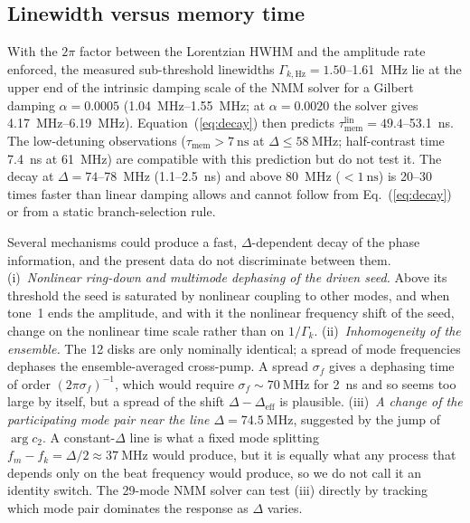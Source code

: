 \documentclass[aps,prb,reprint,superscriptaddress,floatfix]{revtex4-2}
\newcommand{\Deff}{\Delta_{\mathrm{eff}}}
\begin{document}
\subsection{Linewidth versus memory time}\label{sec:disc-tension}

With the $2\pi$ factor between the Lorentzian HWHM and the amplitude rate enforced, the measured sub-threshold linewidths $\Gamma_{k,\mathrm{Hz}}=1.50$--\SI{1.61}{\mega\hertz} lie at the upper end of the intrinsic damping scale of the NMM solver for a Gilbert damping $\alpha=0.0005$ (\SIrange{1.04}{1.55}{\mega\hertz}; at $\alpha=0.0020$ the solver gives \SIrange{4.17}{6.19}{\mega\hertz}). Equation~(\ref{eq:decay}) then predicts $\tau_{\mathrm{mem}}^{\mathrm{lin}}=49.4$--\SI{53.1}{\nano\second}. The low-detuning observations ($\tau_{\mathrm{mem}}>\SI{7}{\nano\second}$ at $\Delta\le\SI{58}{\mega\hertz}$; half-contrast time \SI{7.4}{\nano\second} at \SI{61}{\mega\hertz}) are compatible with this prediction but do not test it. The decay at $\Delta=74$--\SI{78}{\mega\hertz} (1.1--\SI{2.5}{\nano\second}) and above \SI{80}{\mega\hertz} ($<\SI{1}{\nano\second}$) is 20--30 times faster than linear damping allows and cannot follow from Eq.~(\ref{eq:decay}) or from a static branch-selection rule.

Several mechanisms could produce a fast, $\Delta$-dependent decay of the phase information, and the present data do not discriminate between them. (i)~\emph{Nonlinear ring-down and multimode dephasing of the driven seed.} Above its threshold the seed is saturated by nonlinear coupling to other modes, and when tone~1 ends the amplitude, and with it the nonlinear frequency shift of the seed, change on the nonlinear time scale rather than on $1/\Gamma_k$. (ii)~\emph{Inhomogeneity of the ensemble.} The 12 disks are only nominally identical; a spread of mode frequencies dephases the ensemble-averaged cross-pump. A spread $\sigma_f$ gives a dephasing time of order $(2\pi\sigma_f)^{-1}$, which would require $\sigma_f\sim\SI{70}{\mega\hertz}$ for \SI{2}{\nano\second} and so seems too large by itself, but a spread of the shift $\Delta-\Deff$ is plausible. (iii)~\emph{A change of the participating mode pair near the line $\Delta=\SI{74.5}{\mega\hertz}$}, suggested by the jump of $\arg c_2$. A constant-$\Delta$ line is what a fixed mode splitting $f_m-f_k=\Delta/2\approx\SI{37}{\mega\hertz}$ would produce, but it is equally what any process that depends only on the beat frequency would produce, so we do not call it an identity switch. The 29-mode NMM solver can test (iii) directly by tracking which mode pair dominates the response as $\Delta$ varies.
\end{document}
